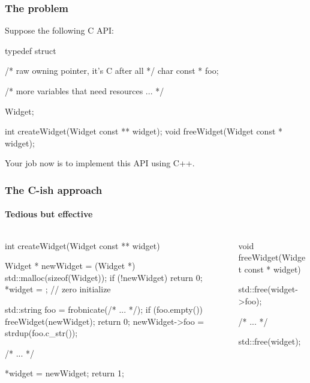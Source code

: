 \documentclass{beamer}
\begin{document}

\begin{frame}[fragile]
\frametitle{The problem}
Suppose the following C API:

\begin{C++}
typedef struct
{
    /* raw owning pointer, it's C after all */
    char const * foo;

    /* more variables that need resources ... */
    
} Widget;

int createWidget(Widget const ** widget);
void freeWidget(Widget const * widget);
\end{C++}

Your job now is to implement this API using C++.
\end{frame}


\begin{frame}[fragile]
\frametitle{The C-ish approach}
\framesubtitle{Tedious but effective}
\begin{columns}
\begin{column}{0.45\textwidth}
\begin{TinyC++}
int createWidget(Widget const ** widget)
{
	Widget * newWidget = (Widget *) std::malloc(sizeof(Widget));
	if (!newWidget)
	{
		return 0;
	}
	*widget = {}; // zero initialize
    
	std::string	foo = frobnicate(/* ... */);
	if (foo.empty())
	{
		freeWidget(newWidget);
		return 0;
	}
	newWidget->foo = strdup(foo.c_str());
    
	/* ... */
    
	*widget = newWidget;
	return 1;
}
\end{TinyC++}
\end{column}
\pause
\begin{column}{0.45\textwidth}
\begin{TinyC++}
void freeWidget(Widget const * widget)
{
	std::free(widget->foo);
    
	/* ... */
    
	std::free(widget);
}
\end{TinyC++}
\end{column}
\end{columns}
\end{frame}

\end{document}

